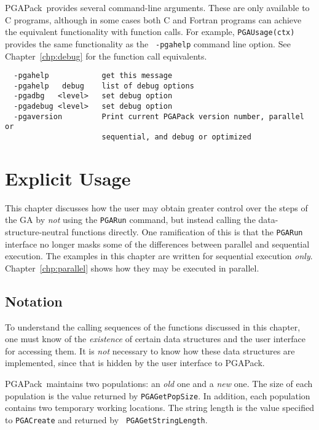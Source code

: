 \documentclass{report}
\newcommand{\pga}{PGAPack}
\begin{document}
\pga\ provides several  command-line arguments.
These are only available to C programs, although in some cases both C and
Fortran programs can achieve the equivalent functionality with function calls.
For example, {\tt PGAUsage(ctx)} provides the same functionality as the {\tt
-pgahelp} command line option.  See Chapter~\ref{chp:debug} for the function
call equivalents.

\begin{verbatim}
  -pgahelp            get this message
  -pgahelp   debug    list of debug options
  -pgadbg   <level>   set debug option
  -pgadebug <level>   set debug option
  -pgaversion         Print current PGAPack version number, parallel or
                      sequential, and debug or optimized
\end{verbatim}

\chapter{Explicit Usage}\label{chp:explicit}

This chapter discusses how the user may obtain greater control over the steps
of the GA by {\em not} using the {\tt PGARun} command, but instead calling the
data-structure-neutral functions directly.  One ramification of this is that
the {\tt PGARun} interface no longer masks some of the differences between
parallel and sequential execution.  The examples in this chapter are written
for sequential execution {\em only}.  Chapter~\ref{chp:parallel} shows how
they may be executed in parallel.


\section{Notation}

To understand the calling sequences of the functions discussed in
this chapter, one must know of the {\em existence} of certain data
structures and the user interface for accessing them.  It is {\em not}
necessary to know how these data structures are implemented, since that is
hidden by the user interface to \pga.

\pga\ maintains two populations: an {\em old} one and a {\em new} one.  The
size of each population is the value returned by {\tt PGAGetPopSize}.  In
addition, each population contains two temporary working locations.  The
string length is the value specified to {\tt PGACreate} and returned by {\tt
PGAGetStringLength}.
\end{document}
